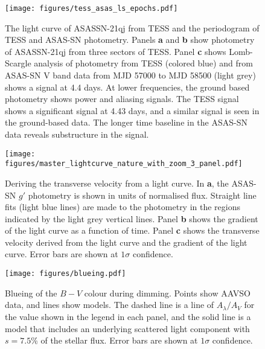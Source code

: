 \documentclass[sn-nature]{sn-jnl}%
\begin{document}
\begin{figure}
   \begin{centering}
\texttt{[image: figures/tess\_asas\_ls\_epochs.pdf]}
      \caption{The light curve of ASASSN-21qj from TESS and the periodogram of TESS and ASAS-SN photometry.
      Panels {\bf a} and {\bf b} show photometry of ASASSN-21qj from three sectors of TESS.
      Panel {\bf c} shows Lomb-Scargle analysis of photometry from TESS (colored blue) and from ASAS-SN V band data from MJD 57000 to MJD 58500 (light grey) shows a signal at 4.4 days.
      At lower frequencies, the ground based photometry shows power and aliasing signals.
      The TESS signal shows a significant signal at 4.43 days, and a similar signal is seen in the ground-based data.
      The longer time baseline in the ASAS-SN data reveals substructure in the signal.}
        \label{fig:TESS_lc}
    \end{centering}
\end{figure}

\begin{figure*}
\begin{centering}
\texttt{[image: figures/master\_lightcurve\_nature\_with\_zoom\_3\_panel.pdf]}
      \caption{Deriving the transverse velocity from a light curve.
      In {\bf a}, the ASAS-SN $g'$ photometry is shown in units of normalised flux.
      Straight line fits (light blue lines) are made to the photometry in the regions indicated by the light grey vertical lines.
      Panel {\bf b} shows the gradient of the light curve as a function of time.
      Panel {\bf c} shows the transverse velocity derived from the light curve and the gradient of the light curve.
      Error bars are shown at $1\sigma$ confidence.
}
        \label{fig:gradientconvert}

\end{centering}
\end{figure*}

\begin{figure}
    \centering
\texttt{[image: figures/blueing.pdf]}
    \caption{Blueing of the $B-V$ colour during dimming.
    Points show AAVSO data, and lines show models.
    The dashed line is a line of $A_\lambda/A_V$ for the value shown in the legend in each panel, and the solid line is a model that includes an underlying scattered light component with $s=7.5$\% of the stellar flux.
    Error bars are shown at $1\sigma$ confidence.
}
    \label{fig:blueing}
\end{figure}
\end{document}
